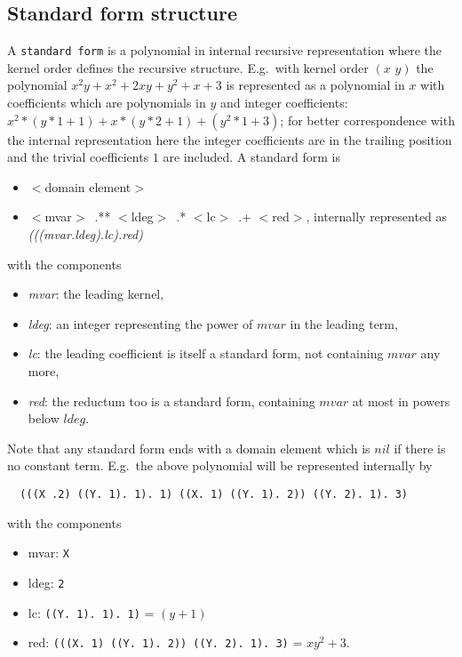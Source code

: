 \documentclass[11pt]{article}
\makeatletter
\newcommand{\ttindex}[1]{\index{#1@{\texttt{#1}}}}
\makeatother
\begin{document}
\subsection{Standard form structure}

A {\tt standard form}\ttindex{standard form} is a polynomial in internal recursive
representation where the kernel order defines the recursive
structure. E.g.\  with kernel order $(x\,\,y)$ the polynomial 
$x^2y +x^2 + 2xy + y^2 + x + 3$ is represented as a polynomial
in $x$ with coefficients which are polynomials in $y$ and integer coefficients:
$x^2*(y*1+1) + x*(y*2+1) +(y^2*1 +3)$; for better correspondence
with the internal representation here the integer coefficients
are in the trailing position and the trivial coefficients $1$ are 
included.
A standard form is 

\begin{itemize}
\item $<$domain element$>$  
\item $<$mvar$>$\ .** $<$ldeg$>$\ .* $<$lc$>$\ .+ $<$red$>$, 
    internally represented as {\em (((mvar.ldeg).lc).red)} 
\end{itemize}
with the components
\begin{itemize}
\item {\em mvar}: the leading kernel,
\item {\em ldeg}: an integer representing the power of $mvar$ in the leading
 term,
\item{\em lc}: the leading coefficient is itself a standard form,
 not containing $mvar$ any more,
\item{\em red}: the reductum too is a standard form, containing $mvar$
  at most in powers below $ldeg$.
\end{itemize}
Note that any standard form ends with a domain element which 
is  $nil$ if there is no constant term.
 E.g.\  the above polynomial
will be represented internally by

\begin{verbatim}
  (((X .2) ((Y. 1). 1). 1) ((X. 1) ((Y. 1). 2)) ((Y. 2). 1). 3)
\end{verbatim}

with the components
\begin{itemize}
\item{mvar}: \verb+X+
\item{ldeg}: \verb+2+
\item{lc}: \verb+((Y. 1). 1). 1)+  = $(y+1)$
\item{red}: \verb+(((X. 1) ((Y. 1). 2)) ((Y. 2). 1). 3)+ = $xy^2+3$.
\end{itemize}
\end{document}
